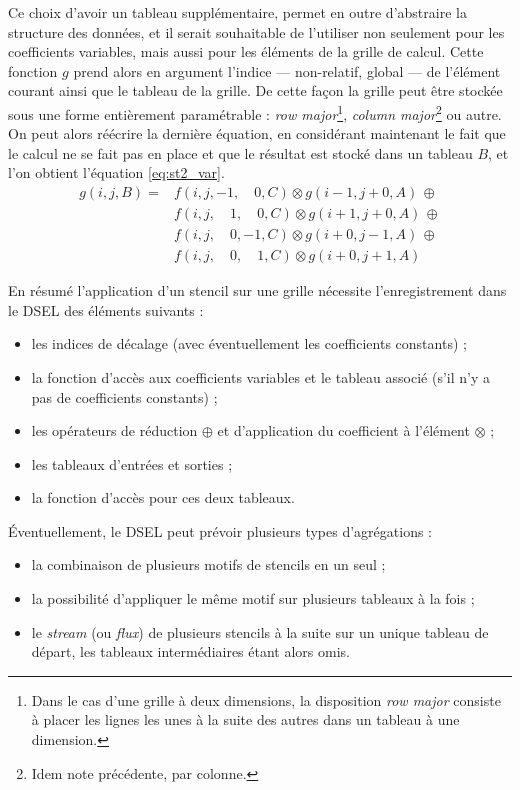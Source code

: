 Ce choix d'avoir un tableau supplémentaire, permet en outre d'abstraire la structure des données, et il serait souhaitable de l'utiliser non seulement pour les coefficients variables, mais aussi pour les éléments de la grille de calcul. Cette fonction $g$ prend alors en argument l'indice --- non-relatif, global --- de l'élément courant ainsi que le tableau de la grille. De cette façon la grille peut être stockée sous une forme entièrement paramétrable : \emph{row major}\footnote{Dans le cas d'une grille à deux dimensions, la disposition \emph{row major} consiste à placer les lignes les unes à la suite des autres dans un tableau à une dimension.}, \emph{column major}\footnote{Idem note précédente, par colonne.} ou autre. On peut alors réécrire la dernière équation, en considérant maintenant le fait que le calcul ne se fait pas en place et que le résultat est stocké dans un tableau $B$, et l'on obtient l'équation \ref{eq:st2_var}.
\begin{equation}
\label{eq:st2_var}
\begin{aligned}
g(i,j,B) = & f(i, j, -1, \quad 0, C) \otimes g(i-1, j+0, A) \, \oplus \\
           & f(i, j, \quad 1, \quad 0, C) \otimes g(i+1,j+0, A) \, \oplus \\
           & f(i, j, \quad 0, -1, C) \otimes g(i+0,j-1, A) \, \oplus \\ 
           & f(i, j, \quad 0, \quad 1, C) \otimes g(i+0,j+1, A)
\end{aligned}
\end{equation}

En résumé l'application d'un stencil sur une grille nécessite l'enregistrement dans le DSEL des éléments suivants : 
\begin{itemize}
\item les indices de décalage (avec éventuellement les coefficients constants) ;
\item la fonction d'accès aux coefficients variables et le tableau associé (s'il n'y a pas de coefficients constants) ;
\item les opérateurs de réduction $\oplus$ et d'application du coefficient à l'élément $\otimes$ ;
\item les tableaux d'entrées et sorties ;
\item la fonction d'accès pour ces deux tableaux.
\end{itemize}

Éventuellement, le DSEL peut prévoir plusieurs types d'agrégations :
\begin{itemize}
\item la combinaison de plusieurs motifs de stencils en un seul ;
\item la possibilité d'appliquer le même motif sur plusieurs tableaux à la fois ;
\item le \emph{stream} (ou \emph{flux}) de plusieurs stencils à la suite sur un unique tableau de départ, les tableaux intermédiaires étant alors omis.
\end{itemize}

